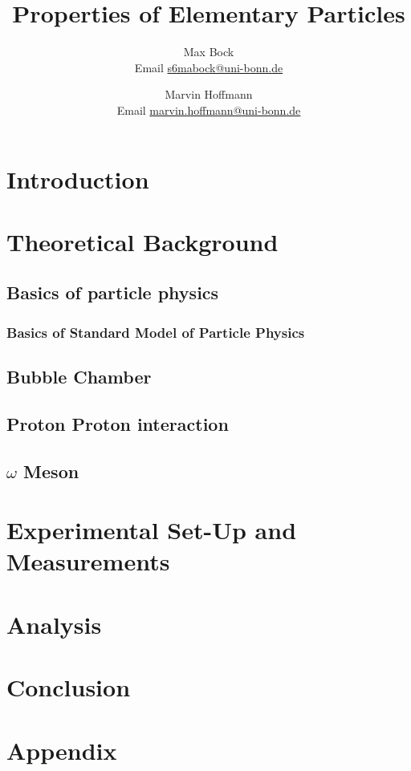 \documentclass[10pt, a4paper, notitlepage, DIV=15]{scrartcl}
\title{Properties of Elementary Particles}
\author{Max Bock \\ Email \href{mailto:s6mabock@uni-bonn.de}{s6mabock@uni-bonn.de} 
	\and Marvin Hoffmann \\ Email \href{mailto:marvin.hoffmann@uni-bonn.de}{marvin.hoffmann@uni-bonn.de} }
\begin{document}
\maketitle
\tableofcontents
\newpage
\section{Introduction}

\section{Theoretical Background}
\subsection{Basics of particle physics}
\subsubsection{Basics of Standard Model of Particle Physics}

\subsection{Bubble Chamber}
\subsection{Proton Proton interaction}
\subsection{$\omega$ Meson}

\section{Experimental Set-Up and Measurements}

\section{Analysis}

\section{Conclusion}

\section{Appendix}
\end{document}

